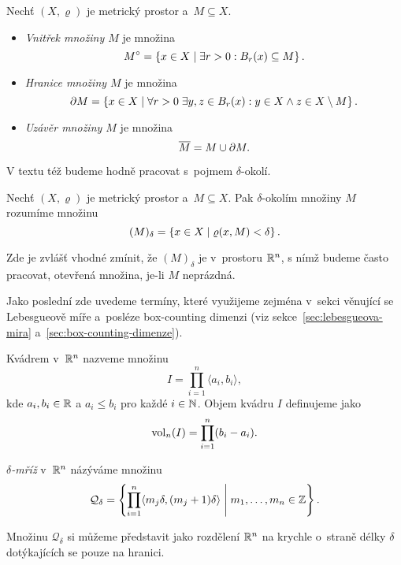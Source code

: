 \begin{definition}\label{def:vnitrek-hranice-uzaver}
    Nechť $(X,\varrho)$ je metrický prostor a~$M\subseteq X$.
    \begin{itemize}
        \item \emph{Vnitřek množiny $M$} je množina
        \[M^\circ=\left\{x\in X\mid \exists r>0: B_r(x)\subseteq M\right\}.\]
        \item \emph{Hranice množiny $M$} je množina
        \[\partial M=\left\{x\in X\mid \forall r>0\;\exists y,z\in B_r(x): y\in X\land z\in X\setminus M\right\}.\]
        \item \emph{Uzávěr množiny $M$} je množina
        \[\overline{M}=M\cup\partial M.\]
    \end{itemize}
\end{definition}
V textu též budeme hodně pracovat s~pojmem $\delta$-okolí.
\begin{definition}\label{def:delta-okoli}
    Nechť $(X,\varrho)$ je metrický prostor a~$M\subseteq X$. Pak $\delta$-okolím množiny $M$ rozumíme množinu
    \[(M)_\delta=\left\{x\in X\mid\varrho(x,M)<\delta\right\}.\]
\end{definition}
Zde je zvlášť vhodné zmínit, že $(M)_\delta$ je v~prostoru $\mathbb{R}^n$, s nímž budeme často pracovat, otevřená množina, je-li $M$ neprázdná.

Jako poslední zde uvedeme termíny, které využijeme zejména v~sekci věnující se Lebesgueově míře a~posléze box-counting dimenzi (viz sekce~\ref{sec:lebesgueova-mira} a~\ref{sec:box-counting-dimenze}).
\begin{definition}[Kvádr]\label{def:kvadr}
    Kvádrem v~$\mathbb{R}^n$ nazveme množinu
    \[I=\prod_{i=1}^{n}\langle a_i,b_i\rangle,\]
    kde $a_i,b_i\in\mathbb{R}$ a $a_i\leqslant b_i$ pro každé $i\in\mathbb{N}$. Objem kvádru $I$ definujeme jako
    \[\operatorname{vol}_n(I)=\prod_{i=1}^{n}(b_i-a_i).\]
\end{definition}
\begin{definition}\label{def:delta-mriz}
    \emph{$\delta$-mříž} v~$\mathbb{R}^n$ názýváme množinu
    \[\mathcal{Q}_\delta=\left\{\prod_{i=1}^{n}\langle m_j\delta,(m_j+1)\delta\rangle\;\middle|\;m_1,\ldots,m_n\in\mathbb{Z}\right\}.\]
\end{definition}
Množinu $\mathcal{Q}_\delta$ si můžeme představit jako rozdělení $\mathbb{R}^n$ na krychle o~straně délky $\delta$ dotýkajících se pouze na hranici.

